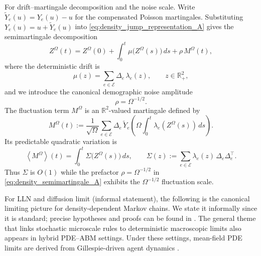 \documentclass[pdflatex,sn-mathphys-ay]{sn-jnl}
\theoremstyle{thmstyleone}
\theoremstyle{definition}
\theoremstyle{remark}
\begin{document}
For drift--martingale decomposition and the noise scale. Write $\widetilde Y_e(u)=Y_e(u)-u$ for the compensated Poisson martingales. Substituting
$Y_e(u)=u+\widetilde Y_e(u)$ into \eqref{eq:density_jump_representation_A} gives the semimartingale decomposition
\begin{equation}\label{eq:density_semimartingale_A}
Z^\Omega(t)
=
Z^\Omega(0)
+\int_0^t \mu\bigl(Z^\Omega(s)\bigr)\,ds
+\rho\,M^\Omega(t),
\end{equation}
where the deterministic drift is
\begin{equation}\label{eq:mu_definition_A}
\mu(z)=\sum_{e\in\mathcal E}\Delta_e\,\lambda_e(z),
\qquad z\in\mathbb{R}_+^2,
\end{equation}
and we introduce the canonical demographic noise amplitude
\begin{equation}\label{eq:rho_definition_A}
\rho=\Omega^{-1/2}.
\end{equation}
The fluctuation term $M^\Omega$ is an $\mathbb{R}^2$-valued martingale defined by
\begin{equation}\label{eq:martingale_MOmega_A}
M^\Omega(t)
:=
\frac{1}{\sqrt{\Omega}}\sum_{e\in\mathcal  E} \Delta_e\,
\widetilde Y_e\!\left(\Omega\int_0^t \lambda_e(Z^\Omega(s))\,ds\right).
\end{equation}
Its predictable quadratic variation is
\begin{equation}\label{eq:quad_var_MOmega_A}
\left\langle M^\Omega\right\rangle(t)
=
\int_0^t \Sigma\bigl(Z^\Omega(s)\bigr)\,ds,
\qquad
\Sigma(z):=\sum_{e\in\mathcal E}\lambda_e(z)\,\Delta_e\Delta_e^\top.
\end{equation}
Thus $\Sigma$ is $O(1)$ while the prefactor $\rho=\Omega^{-1/2}$ in \eqref{eq:density_semimartingale_A} exhibits the
$\Omega^{-1/2}$ fluctuation scale.

For LLN and diffusion limit (informal statement), the following is the canonical limiting picture for density-dependent Markov chains. We state it informally since it is
standard; precise hypotheses and proofs can be found in \citep{kurtz_solutions_1970,kurtz_limit_1971,kurtz_limit_1976,ethier_markov_1986}. The general theme that links stochastic microscale rules to deterministic macroscopic limits also appears in hybrid PDE–ABM settings. Under these settings, mean-field PDE limits are derived from Gillespie-driven agent dynamics \citep{wang_analysis_2025}.  
\end{document}
